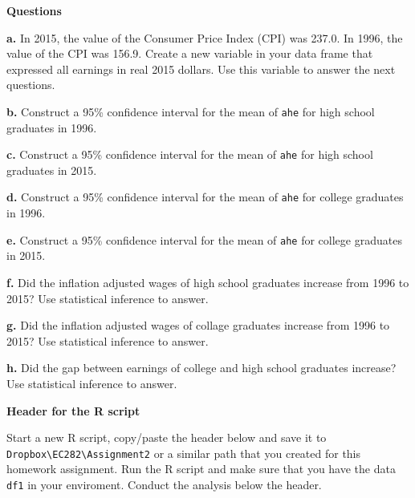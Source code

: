 \documentclass[
]{book}
\begin{document}
\textbf{Questions}

\textbf{a.} In 2015, the value of the Consumer Price Index (CPI) was 237.0. In 1996, the value of the CPI was 156.9. Create a new variable in your data frame that expressed all earnings in real 2015 dollars. Use this variable to answer the next questions.

\textbf{b.} Construct a 95\% confidence interval for the mean of \texttt{ahe} for high school graduates in 1996.

\textbf{c.} Construct a 95\% confidence interval for the mean of \texttt{ahe} for high school graduates in 2015.

\textbf{d.} Construct a 95\% confidence interval for the mean of \texttt{ahe} for college graduates in 1996.

\textbf{e.} Construct a 95\% confidence interval for the mean of \texttt{ahe} for college graduates in 2015.

\textbf{f.} Did the inflation adjusted wages of high school graduates increase from 1996 to 2015? Use statistical inference to answer.

\textbf{g.} Did the inflation adjusted wages of collage graduates increase from 1996 to 2015? Use statistical inference to answer.

\textbf{h.} Did the gap between earnings of college and high school graduates increase? Use statistical inference to answer.

\textbf{Header for the R script}

Start a new R script, copy/paste the header below and save it to \texttt{Dropbox\textbackslash{}EC282\textbackslash{}Assignment2} or a similar path that you created for this homework assignment. Run the R script and make sure that you have the data \texttt{df1} in your enviroment. Conduct the analysis below the header.
\end{document}

